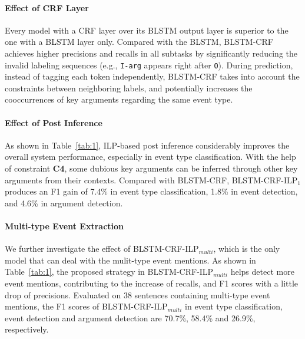 
\paragraph{Effect of CRF Layer} 
Every model with a CRF layer over its BLSTM output layer is superior to the one with a BLSTM layer only. Compared with the BLSTM, BLSTM-CRF achieves higher precisions and recalls in all subtasks by significantly reducing the invalid labeling sequences (e.g., \texttt{I-arg} appears right after \texttt{O}). During prediction, instead of tagging each token independently, BLSTM-CRF takes into account the constraints between neighboring labels, and potentially increases the cooccurrences of key arguments regarding the same event type. %

\paragraph{Effect of Post Inference} 
As shown in Table~\ref{tab:1}, ILP-based post inference considerably improves the overall system performance, especially in event type classification. With the help of constraint \textbf{C4},  some dubious key arguments can be inferred through other key arguments from their contexts. Compared with BLSTM-CRF, BLSTM-CRF-ILP$_1$ produces an F1 gain of 7.4\% in event type classification, 1.8\% in event detection, and 4.6\% in argument detection. %

\paragraph{Multi-type Event Extraction}
We further investigate the effect of BLSTM-CRF-ILP$_{multi}$, which is the only model that can deal with the mulit-type event mentions. As shown in Table~\ref{tab:1}, the proposed strategy in BLSTM-CRF-ILP$_{multi}$ helps detect more event mentions, contributing to the increase of recalls, and F1 scores with a little drop of precisions. Evaluated on 38 sentences containing multi-type event mentions, the F1 scores of BLSTM-CRF-ILP$_{multi}$ in event type classification, event detection and argument detection are 70.7\%, 58.4\% and 26.9\%, respectively. 

